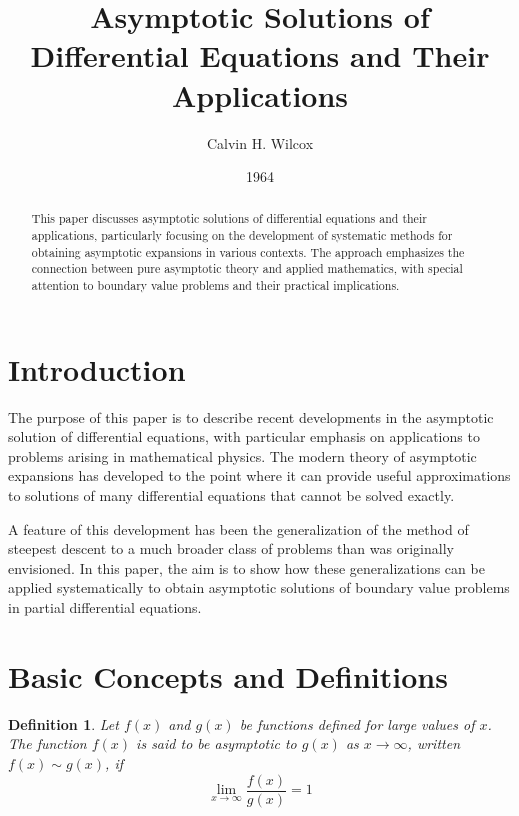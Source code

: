 \documentclass[11pt]{article}
\title{Asymptotic Solutions of Differential Equations and Their Applications}
\author{Calvin H. Wilcox}
\date{1964}
\newtheorem{definition}[theorem]{Definition}
\begin{document}
\maketitle

\begin{abstract}
This paper discusses asymptotic solutions of differential equations and their applications, particularly focusing on the development of systematic methods for obtaining asymptotic expansions in various contexts. The approach emphasizes the connection between pure asymptotic theory and applied mathematics, with special attention to boundary value problems and their practical implications.
\end{abstract}

\section{Introduction}\label{sec:introduction}

The purpose of this paper is to describe recent developments in the asymptotic solution of differential equations, with particular emphasis on applications to problems arising in mathematical physics. The modern theory of asymptotic expansions has developed to the point where it can provide useful approximations to solutions of many differential equations that cannot be solved exactly.

A feature of this development has been the generalization of the method of steepest descent to a much broader class of problems than was originally envisioned. In this paper, the aim is to show how these generalizations can be applied systematically to obtain asymptotic solutions of boundary value problems in partial differential equations.

\section{Basic Concepts and Definitions}\label{sec:basic_concepts}

\begin{definition}\label{def:asymptotic_expansion}
Let $f(x)$ and $g(x)$ be functions defined for large values of $x$. The function $f(x)$ is said to be asymptotic to $g(x)$ as $x \to \infty$, written $f(x) \sim g(x)$, if
\begin{equation}\label{eq:asymptotic_relation}
\lim_{x \to \infty} \frac{f(x)}{g(x)} = 1
\end{equation}
\end{definition}
\end{document}
